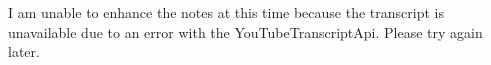 \documentclass[11pt,a4paper]{article}
\begin{document}
I am unable to enhance the notes at this time because the transcript is unavailable due to an error with the YouTubeTranscriptApi. Please try again later.
\end{document}
